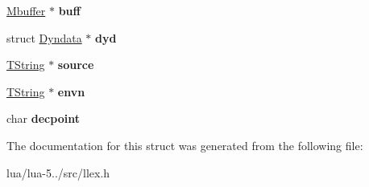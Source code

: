 \begin{DoxyCompactItemize}
\item 
\hypertarget{struct_lex_state_aab00ebdc0eaf42caa098ecb6ca3c8389}{\hyperlink{struct_mbuffer}{Mbuffer} $\ast$ {\bfseries buff}}\label{struct_lex_state_aab00ebdc0eaf42caa098ecb6ca3c8389}

\item 
\hypertarget{struct_lex_state_a3275102e0a909a24d21e8dd183847a2b}{struct \hyperlink{struct_dyndata}{Dyndata} $\ast$ {\bfseries dyd}}\label{struct_lex_state_a3275102e0a909a24d21e8dd183847a2b}

\item 
\hypertarget{struct_lex_state_a054af516711cc3d173a73a301497ff27}{\hyperlink{union_t_string}{T\+String} $\ast$ {\bfseries source}}\label{struct_lex_state_a054af516711cc3d173a73a301497ff27}

\item 
\hypertarget{struct_lex_state_a1f3368576038a65ab629da91de3edfaf}{\hyperlink{union_t_string}{T\+String} $\ast$ {\bfseries envn}}\label{struct_lex_state_a1f3368576038a65ab629da91de3edfaf}

\item 
\hypertarget{struct_lex_state_a0673e50a1368c36f24624a710e42e389}{char {\bfseries decpoint}}\label{struct_lex_state_a0673e50a1368c36f24624a710e42e389}

\end{DoxyCompactItemize}


The documentation for this struct was generated from the following file\+:\begin{DoxyCompactItemize}
\item 
lua/lua-\/5../src/llex.\+h\end{DoxyCompactItemize}
